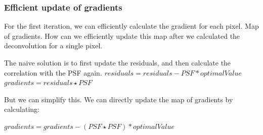 \subsubsection{Efficient update of gradients}
For the first iteration, we can efficiently calculate the gradient for each pixel. 
Map of gradients. How can we efficiently update this map after we calculated the deconvolution for a single pixel.




The naive solution is to first update the residuals, and then calculate the correlation with the PSF again.
$residuals = residuals - PSF * optimalValue$
$gradients = residuals \star PSF$


But we can simplify this. We can directly update the map of gradients by calculating:

$gradients = gradients - (PSF \star PSF) * optimalValue$

